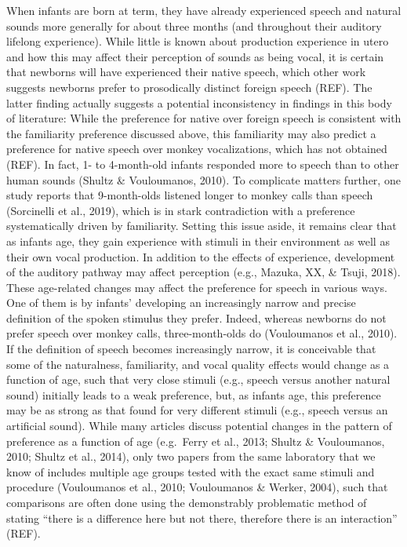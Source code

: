 \documentclass[man]{apa6}
\begin{document}
When infants are born at term, they have already experienced speech and
natural sounds more generally for about three months (and throughout
their auditory lifelong experience). While little is known about
production experience in utero and how this may affect their perception
of sounds as being vocal, it is certain that newborns will have
experienced their native speech, which other work suggests newborns
prefer to prosodically distinct foreign speech (REF). The latter finding
actually suggests a potential inconsistency in findings in this body of
literature: While the preference for native over foreign speech is
consistent with the familiarity preference discussed above, this
familiarity may also predict a preference for native speech over monkey
vocalizations, which has not obtained (REF). In fact, 1- to 4-month-old
infants responded more to speech than to other human sounds (Shultz \&
Vouloumanos, 2010). To complicate matters further, one study reports
that 9-month-olds listened longer to monkey calls than speech
(Sorcinelli et al., 2019), which is in stark contradiction with a
preference systematically driven by familiarity. Setting this issue
aside, it remains clear that as infants age, they gain experience with
stimuli in their environment as well as their own vocal production. In
addition to the effects of experience, development of the auditory
pathway may affect perception (e.g., Mazuka, XX, \& Tsuji, 2018). These
age-related changes may affect the preference for speech in various
ways. One of them is by infants' developing an increasingly narrow and
precise definition of the spoken stimulus they prefer. Indeed, whereas
newborns do not prefer speech over monkey calls, three-month-olds do
(Vouloumanos et al., 2010). If the definition of speech becomes
increasingly narrow, it is conceivable that some of the naturalness,
familiarity, and vocal quality effects would change as a function of
age, such that very close stimuli (e.g., speech versus another natural
sound) initially leads to a weak preference, but, as infants age, this
preference may be as strong as that found for very different stimuli
(e.g., speech versus an artificial sound). While many articles discuss
potential changes in the pattern of preference as a function of age
(e.g.~Ferry et al., 2013; Shultz \& Vouloumanos, 2010; Shultz et al.,
2014), only two papers from the same laboratory that we know of includes
multiple age groups tested with the exact same stimuli and procedure
(Vouloumanos et al., 2010; Vouloumanos \& Werker, 2004), such that
comparisons are often done using the demonstrably problematic method of
stating \enquote{there is a difference here but not there, therefore
there is an interaction} (REF).
\end{document}
